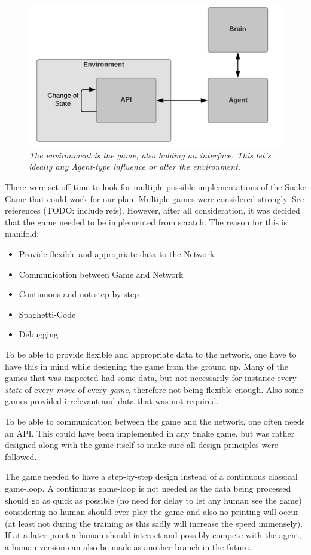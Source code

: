 \documentclass[
a4paper,
11pt,
english
]{report}
\newenvironment{myitemize}{
    \begin{itemize}
    \setlength{\itemsep}{0pt}
    \setlength{\parskip}{0pt}
    \setlength{\parsep}{0pt}
}{\end{itemize}}
\begin{document}
\begin{figure}[h]
    \centering
    \includegraphics[width=.7\textwidth]{overview}
    \caption{\textit{The environment is the game, also holding an interface. This let's ideally any Agent-type influence or alter the environment.}}
    \label{fig:overview}
\end{figure}

There were set off time to look for multiple possible implementations of the Snake Game that could work for our plan. Multiple games were considered strongly. See references (TODO: include refs). However, after all consideration, it was decided that the game needed to be implemented from scratch. The reason for this is manifold:

\begin{myitemize}
    \item Provide flexible and appropriate data to the Network
    \item Communication between Game and Network
    \item Continuous and not step-by-step
    \item Spaghetti-Code
    \item Debugging
\end{myitemize}

To be able to provide flexible and appropriate data to the network, one have to have this in mind while designing the game from the ground up. Many of the games that was inspected had some data, but not necessarily for instance every \textit{state} of every \textit{move} of every \textit{game}, therefore not being flexible enough. Also some games provided irrelevant and data that was not required.

To be able to communication between the game and the network, one often needs an API. This could have been implemented in any Snake game, but was rather designed along with the game itself to make sure all design principles were followed.

The game needed to have a step-by-step design instead of a continuous classical game-loop. A continuous game-loop is not needed as the data being processed should go as quick as possible (no need for delay to let any human see the game) considering no human should ever play the game and also no printing will occur (at least not during the training as this sadly will increase the speed immensely). If at a later point a human should interact and possibly compete with the agent, a human-version can also be made as another branch in the future.
\end{document}
